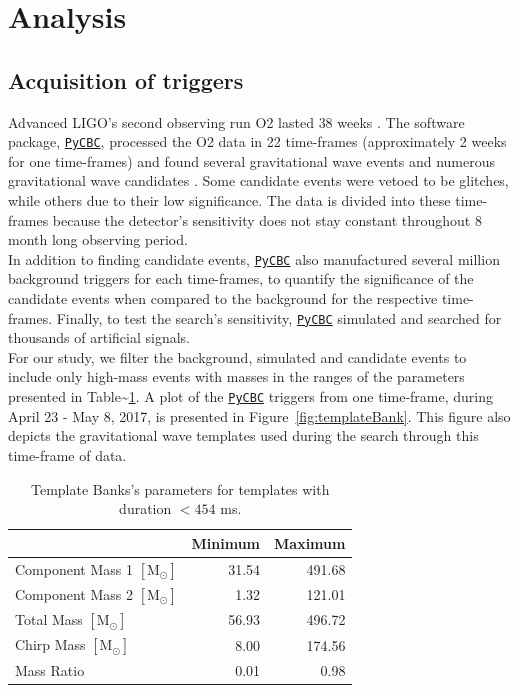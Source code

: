 \documentclass[%
preprint,
 amsmath,amssymb,
 aps,
]{revtex4}
\newcommand{\pycbc}{{\sc \href{https://pycbc.org/}{\texttt{PyCBC}}}\xspace}
\begin{document}
\section{Analysis}\label{sec:Analysis}

\subsection{Acquisition of triggers}
Advanced LIGO's second observing run O2 lasted $38$ weeks \cite{GWOSC}. The software package, \pycbc \cite{pycbc_code}, processed the O2 data in 22 time-frames (approximately 2 weeks for one time-frames) and found several gravitational wave events and numerous gravitational wave candidates \cite{pycbc_og0, pycbc_og1, pycbc_og2, pycbc_og3, pycbc_og4, pycbc_og5}. Some candidate events were vetoed to be glitches, while others due to their low significance. The data is divided into these time-frames because the detector's sensitivity does not stay constant throughout 8 month long observing period.\\

In addition to finding candidate events, \pycbc also manufactured several million background triggers for each time-frames, to quantify the significance of the candidate events when compared to the background for the respective time-frames. Finally, to test the search's sensitivity, \pycbc simulated and searched for thousands of artificial signals. \\

For our study, we filter the background, simulated and candidate events to  include only high-mass events with masses in the ranges of the parameters presented in Table\textasciitilde\ref{tab:parameters}. A plot of the \pycbc triggers from one time-frame, during April 23 - May 8, 2017, is presented in Figure~\ref{fig:templateBank}. This figure also depicts the gravitational wave templates used during the search through this time-frame of data. \\


\begin{table}[t]

\caption[BBH parameters corresponding to durations $<454$ ms]{\label{tab:parameters}Template Banks's parameters for templates with duration $<454$ ms.}
\centering
\begin{tabular}{lrr}
\toprule
  & Minimum & Maximum\\
\midrule
Component Mass 1 $[\text{M}_{\odot}]$ & 31.54 & 491.68\\
Component Mass 2 $[\text{M}_{\odot}]$ & 1.32 & 121.01\\
Total Mass $[\text{M}_{\odot}]$ & 56.93 & 496.72\\
Chirp Mass $[\text{M}_{\odot}]$ & 8.00 & 174.56\\
Mass Ratio & 0.01 & 0.98\\
\end{tabular}
\end{table}
\end{document}
